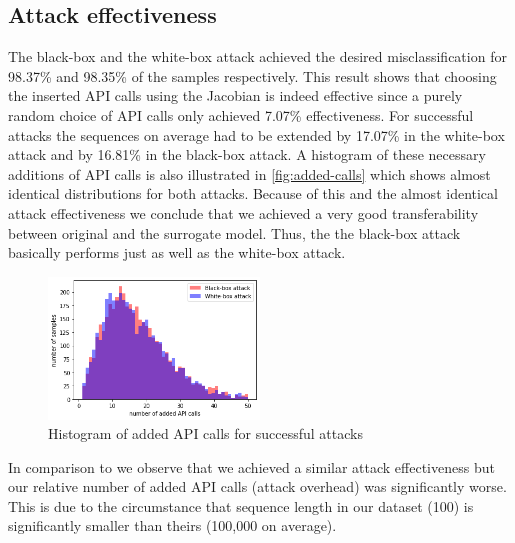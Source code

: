 \documentclass[final]{cvpr}
\begin{document}
\subsection{Attack effectiveness}
The black-box and the white-box attack achieved the desired 
misclassification for 98.37\% and 98.35\% of the samples respectively. This 
result shows that choosing the inserted API calls using the Jacobian is indeed 
effective since a purely random choice of API calls only achieved 7.07\% 
effectiveness. For successful 
attacks the sequences on average had to be extended by 17.07\% in the 
white-box attack and by 16.81\% in the black-box attack. A histogram of these 
necessary additions of API calls is also illustrated in 
\autoref{fig:added-calls} which shows almost identical distributions for both 
attacks. Because of this and the almost identical attack effectiveness we 
conclude that we achieved a very good transferability between original and the 
surrogate model. Thus, the the black-box attack basically performs just as well 
as the white-box attack.

\begin{figure}
	\centering
	\includegraphics[width=0.5\textwidth]{attack-additions-histogram}
	\caption{Histogram of added API calls for successful attacks}
	\label{fig:added-calls}
\end{figure}

In comparison to \autocite[12]{DBLP:journals/corr/RosenbergSRE17} we observe 
that we achieved a similar attack effectiveness but our relative number of 
added API calls (attack overhead) was significantly worse. This is due to the 
circumstance that sequence length in our dataset (100) is significantly smaller 
than theirs (100,000 on average).
\end{document}
